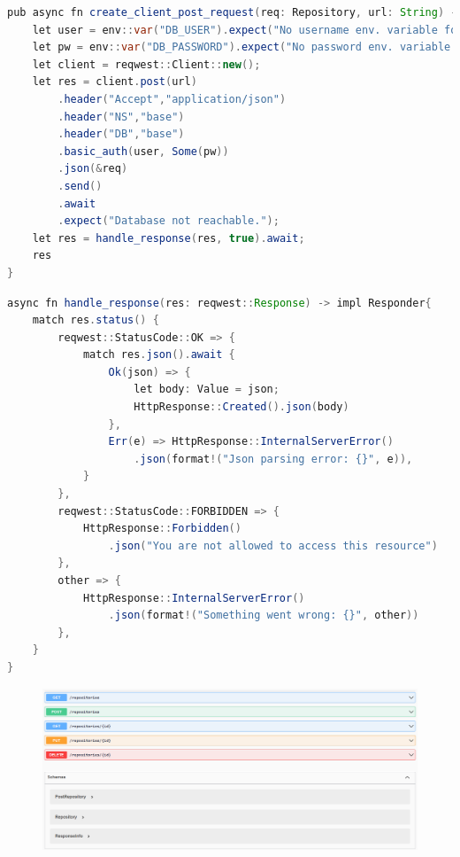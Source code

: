 \documentclass[notitlepage, hidelinks]{article}
\begin{document}
\begin{lstlisting}[language=Java,frame=single,caption=Senden eines HTTP Requests (hier an die Datenbank) mit Headern,label=apitwo]
pub async fn create_client_post_request(req: Repository, url: String) -> impl Responder{
    let user = env::var("DB_USER").expect("No username env. variable found");
    let pw = env::var("DB_PASSWORD").expect("No password env. variable found");
    let client = reqwest::Client::new();
    let res = client.post(url)
        .header("Accept","application/json")
        .header("NS","base")
        .header("DB","base")
        .basic_auth(user, Some(pw))
        .json(&req)
        .send()
        .await
        .expect("Database not reachable.");
    let res = handle_response(res, true).await;
    res
}
\end{lstlisting}

\begin{lstlisting}[language=Java,frame=single,caption=Auflösung des Responses (als Option) mit Pattern Matching,label=apitwo]
async fn handle_response(res: reqwest::Response) -> impl Responder{
    match res.status() {
        reqwest::StatusCode::OK => {
            match res.json().await {
                Ok(json) => {
                    let body: Value = json;
                    HttpResponse::Created().json(body)
                },
                Err(e) => HttpResponse::InternalServerError()
                    .json(format!("Json parsing error: {}", e)),
            }
        },
        reqwest::StatusCode::FORBIDDEN => {
            HttpResponse::Forbidden()
                .json("You are not allowed to access this resource")
        },
        other => {
            HttpResponse::InternalServerError()
                .json(format!("Something went wrong: {}", other))
        },
    }
}
\end{lstlisting}

\begin{figure}[H]
\centering
  \includegraphics[width=\textwidth]{images/swagger.png}
  \caption{}
  \label{fig:apione}
\end{figure}
\end{document}
